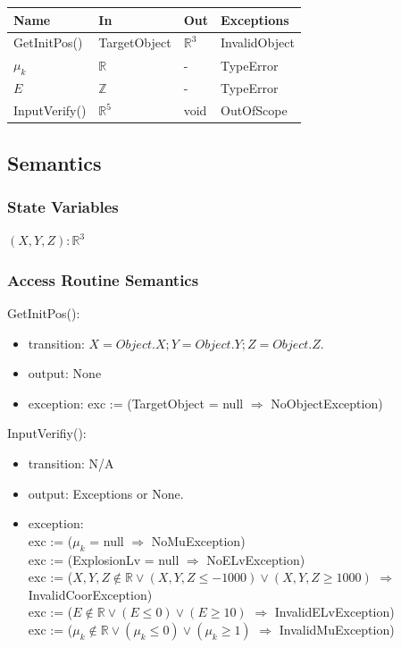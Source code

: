 \documentclass[12pt, titlepage]{article}
\begin{document}
\begin{center}
\begin{tabular}{p{2cm} p{4cm} p{4cm} p{2cm}}
\hline
\textbf{Name} & \textbf{In} & \textbf{Out} & \textbf{Exceptions} \\
\hline
GetInitPos() & TargetObject & $\mathbb{R}^{3}$ & InvalidObject\\
$\mu_{k}$ &  $\mathbb{R}$ & - & TypeError\\
$E$ & $\mathbb{Z}$ & - & TypeError\\
InputVerify() &  $\mathbb{R}^{5}$ & void & OutOfScope\\
\hline
\end{tabular}
\end{center}

\subsection{Semantics}

\subsubsection{State Variables}
$(X,Y,Z):\mathbb{R}^{3}$
\subsubsection{Access Routine Semantics}

\noindent GetInitPos():
\begin{itemize}
	\item transition: $X = Object.X; Y = Object.Y; Z = Object.Z$. 
	\item output:  None
	\item exception: exc := (TargetObject = null $\Rightarrow $ NoObjectException)
\end{itemize}

\noindent InputVerifiy():
\begin{itemize}
\item transition: N/A
\item output: Exceptions or None.
\item exception:\\
exc := ($\mu_{k}$ = null $\Rightarrow $ NoMuException)\\
exc := (ExplosionLv = null $\Rightarrow $ NoELvException)\\
exc := ($X,Y,Z \notin \mathbb{R} \vee (X,Y,Z \le -1000) \vee (X,Y,Z \ge 1000)$ $\Rightarrow $ InvalidCoorException)\\
exc := ($E \notin \mathbb{R} \vee (E \leq 0) \vee (E \geq 10)$ $\Rightarrow $ InvalidELvException)\\
exc := ($\mu_{k} \notin \mathbb{R} \vee (\mu_{k} \le 0) \vee (\mu_{k} \ge 1)$ $\Rightarrow $ InvalidMuException)\\
\end{itemize}
\end{document}
